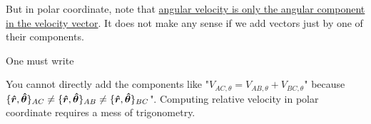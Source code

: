 \documentclass[class=article, crop=false, 12pt]{standalone}
\begin{document}

But in polar coordinate, note that \ul{angular velocity is only the angular component in the velocity vector}.
It does not make any sense if we add vectors just by one of their components.



One must write 

You cannot directly add the components like 
"$V_{AC,\theta}=V_{AB,\theta}+V_{BC,\theta}$" because 
$\{\vu*{r},\vu*{\theta}\}_{AC} \neq \{\vu*{r},\vu*{\theta}\}_{AB} \neq \{\vu*{r},\vu*{\theta}\}_{BC}$".
Computing relative velocity in polar coordinate requires a mess of trigonometry.


\theend
\end{document}
